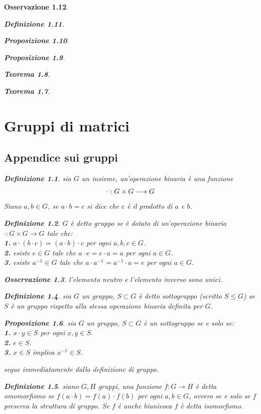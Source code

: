 \documentclass[oneside, 11pt]{amsbook}
\makeatletter
\newcommand{\0}{{(0)}}
\newcommand{\3}{{(3)}}
\theoremstyle{colonplain}
\newtheorem{thm}{Teorema}[chapter]
\newtheorem{prop}[thm]{Proposizione}
\theoremstyle{colondefinition}
\newtheorem{defn}[thm]{Definizione}
\theoremstyle{colonremark}
\newtheorem{rmk}[thm]{Osservazione}
\numberwithin{equation}{chapter}
\renewcommand{\proofname}{Dimostrazione}
\renewenvironment{proof}[1][\proofname]{\par
  \pushQED{\end{proof}}%
  \normalfont \topsep6\p@\@plus6\p@\relax
  \trivlist
  \item[\hskip\labelsep\bfseries #1:]\ignorespaces
}{%
  \popQED\endtrivlist\@endpefalse
}
\makeatother
\begin{document}
\begin{rmk}
\begin{defn}
\begin{prop}
\begin{prop}
\begin{thm}
\begin{thm}
\chapter{Gruppi di matrici}
\section{Appendice sui gruppi}
\begin{defn}
sia $G$ un insieme, un'operazione binaria è una funzione
\begin{align}
    \cdot : G \times G \longrightarrow G \notag
\end{align}
Siano $a, b \in G$, se $a \cdot b = c$ si dice che $c$ è il \textit{prodotto} di $a$ e $b$.
\end{defn}
\begin{defn}
$G$ è detto \textit{gruppo} se è dotato di un'operazione binaria \\ $\cdot : G \times G \longrightarrow G$ tale che: \\
\textbf{1.} $a \cdot (b \cdot c) = (a \cdot b) \cdot c$ per ogni $a, b, c \in G$. \\
\textbf{2.} esiste $e \in G$ tale che $a \cdot e = e \cdot a = a$ per ogni $a \in G$. \\
\textbf{3.} esiste $a^{-1} \in G$ tale che $a \cdot a^{-1} = a^{-1} \cdot a = e$ per ogni $a \in G$.
\end{defn}
\begin{rmk}
l'elemento neutro e l'elemento inverso sono unici.
\end{rmk}
\begin{defn}
sia $G$ un gruppo, $S \subset G$ è detto \textit{sottogruppo} (scritto $S \leq G$) se $S$ è un gruppo rispetto alla stessa operazione binaria definita per $G$.
\end{defn}
\begin{prop}
sia $G$ un gruppo, $S \subset G$ è un sottogruppo se e solo se: \\
\textbf{1.} $x \cdot y \in S$ per ogni $x, y \in S$. \\
\textbf{2.} $e \in S$. \\
\textbf{3.} $x \in S$ implica $x^{-1} \in S$.
\begin{proof}
segue immediatamente dalla definizione di gruppo.
\end{proof}
\begin{defn}
siano $G, H$ gruppi, una funzione $f : G \longrightarrow H$ è detta \textit{omomorfismo} se $f(a \cdot b) = f(a) \cdot f(b)$ per ogni $a, b \in G$, ovvero se e solo se $f$ \textit{preserva la struttura di gruppo}. Se $f$ è anche biunivoca $f$ è detta \textit{isomorfismo}.

\end{defn}
\end{prop}
\end{thm}
\end{thm}
\end{prop}
\end{prop}
\end{defn}
\end{rmk}
\end{document}
